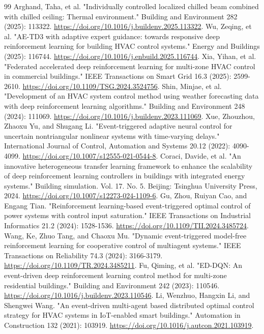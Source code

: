 \documentclass[preprint,12pt,number]{elsarticle}
\begin{document}
\begin{thebibliography}{99}
 Arghand, Taha, et al. "Individually controlled localized chilled beam combined with chilled ceiling: Thermal environment." Building and Environment 282 (2025): 113322. \url{https://doi.org/10.1016/j.buildenv.2025.113322}.
 Wu, Zeqing, et al. "AE-TD3 with adaptive expert guidance: towards responsive deep reinforcement learning for building HVAC control systems." Energy and Buildings (2025): 116744. \url{https://doi.org/10.1016/j.enbuild.2025.116744}.
 Xia, Yihan, et al. "Federated accelerated deep reinforcement learning for multi-zone HVAC control in commercial buildings." IEEE Transactions on Smart Grid 16.3 (2025): 2599-2610. \url{https://doi.org/10.1109/TSG.2024.3524756}.
 Shin, Minjae, et al. "Development of an HVAC system control method using weather forecasting data with deep reinforcement learning algorithms." Building and Environment 248 (2024): 111069. \url{https://doi.org/10.1016/j.buildenv.2023.111069}.
 Xue, Zhouzhou, Zhaoxu Yu, and Shugang Li. "Event-triggered adaptive neural control for uncertain nontriangular nonlinear systems with time-varying delays." International Journal of Control, Automation and Systems 20.12 (2022): 4090-4099. \url{https://doi.org/10.1007/s12555-021-0544-8}.
 Coraci, Davide, et al. "An innovative heterogeneous transfer learning framework to enhance the scalability of deep reinforcement learning controllers in buildings with integrated energy systems." Building simulation. Vol. 17. No. 5. Beijing: Tsinghua University Press, 2024. \url{https://doi.org/10.1007/s12273-024-1109-6}.
 Gu, Zhou, Ruiyan Cao, and Engang Tian. "Reinforcement learning-based event-triggered optimal control of power systems with control input saturation." IEEE Transactions on Industrial Informatics 21.2 (2024): 1528-1536. \url{https://doi.org/10.1109/TII.2024.3485724}.
 Wang, Ke, Zhuo Tang, and Chaoxu Mu. "Dynamic event-triggered model-free reinforcement learning for cooperative control of multiagent systems." IEEE Transactions on Reliability 74.3 (2024): 3166-3179. \url{https://doi.org/10.1109/TR.2024.3485211}.
 Fu, Qiming, et al. "ED-DQN: An event-driven deep reinforcement learning control method for multi-zone residential buildings." Building and Environment 242 (2023): 110546. \url{https://doi.org/10.1016/j.buildenv.2023.110546}.
 Li, Wenzhuo, Hangxin Li, and Shengwei Wang. "An event-driven multi-agent based distributed optimal control strategy for HVAC systems in IoT-enabled smart buildings." Automation in Construction 132 (2021): 103919. \url{https://doi.org/10.1016/j.autcon.2021.103919}.

\end{thebibliography}
\end{document}
